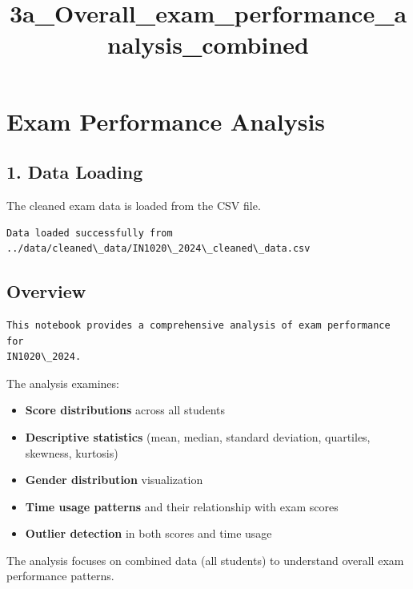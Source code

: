 \documentclass[11pt]{article}
\title{3a\_Overall\_exam\_performance\_analysis\_combined}
\providecommand{\tightlist}{%
      \setlength{\itemsep}{0pt}\setlength{\parskip}{0pt}}
\begin{document}
    
    \maketitle
    
    

    
    \section{Exam Performance Analysis}\label{exam-performance-analysis}

    \subsection{1. Data Loading}\label{data-loading}

The cleaned exam data is loaded from the CSV file.

    \begin{Verbatim}[commandchars=\\\{\}]
Data loaded successfully from ../data/cleaned\_data/IN1020\_2024\_cleaned\_data.csv
    \end{Verbatim}

    \subsection{Overview}\label{overview}

    \begin{Verbatim}[commandchars=\\\{\}]
This notebook provides a comprehensive analysis of exam performance for
IN1020\_2024.
    \end{Verbatim}

    The analysis examines:

\begin{itemize}
\tightlist
\item
  \textbf{Score distributions} across all students
\item
  \textbf{Descriptive statistics} (mean, median, standard deviation,
  quartiles, skewness, kurtosis)
\item
  \textbf{Gender distribution} visualization
\item
  \textbf{Time usage patterns} and their relationship with exam scores
\item
  \textbf{Outlier detection} in both scores and time usage
\end{itemize}

The analysis focuses on combined data (all students) to understand
overall exam performance patterns.
\end{document}

